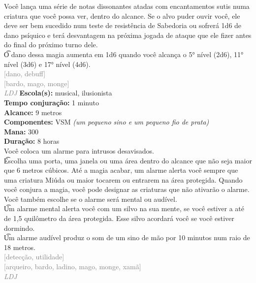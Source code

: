 \documentclass{RPG_Adventure}[2021/10/20]
\begin{document}
{\normalsize Você lança uma série de notas dissonantes atadas com encantamentos sutis numa criatura que você possa ver, dentro do alcance. Se o alvo puder ouvir você, ele deve ser bem sucedido num teste de resistência de Sabedoria ou sofrerá 1d6 de dano psíquico e terá desvantagem na próxima jogada de ataque que ele fizer antes do final do próximo turno dele.\\\t O dano dessa magia aumenta em 1d6 quando você alcança o 5° nível (2d6), 11° nível (3d6) e 17° nível (4d6).\\}
{\scriptsize \textcolor{gray}{[dano, debuff]\\}}
{\scriptsize \textcolor{gray}{[bardo, mago, monge]\\}}
{\tiny \textcolor{gray}{\textit{LDJ}}}\jump{}
{\small \t \textbf{Escola(s):} musical, ilusionista\\\t \textbf{Tempo conjuração:} 1 minuto\\\t \textbf{Alcance:} 9 metros\\\t \textbf{Componentes:} VSM \textit{(um pequeno sino e um pequeno fio de prata)}\\\t \textbf{Mana:} 300\\\t \textbf{Duração:} 8 horas\\}
{\normalsize Você coloca um alarme para intrusos desavisados.\\\t Escolha uma porta, uma janela ou uma área dentro do alcance que não seja maior que 6 metros cúbicos. Até a magia acabar, um alarme alerta você sempre que uma criatura Miúda ou maior tocarem ou entrarem na área protegida. Quando você conjura a magia, você pode designar as criaturas que não ativarão o alarme. Você também escolhe se o alarme será mental ou audível.\\\t Um alarme mental alerta você com um silvo na sua mente, se você estiver a até de 1,5 quilômetro da área protegida. Esse silvo acordará você se você estiver dormindo.\\\t Um alarme audível produz o som de um sino de mão por 10 minutos num raio de 18 metros. \\}
{\scriptsize \textcolor{gray}{[detecção, utilidade]\\}}
{\scriptsize \textcolor{gray}{[arqueiro, bardo, ladino, mago, monge, xamã]\\}}
{\tiny \textcolor{gray}{\textit{LDJ}}}\jump{}
\end{document}
